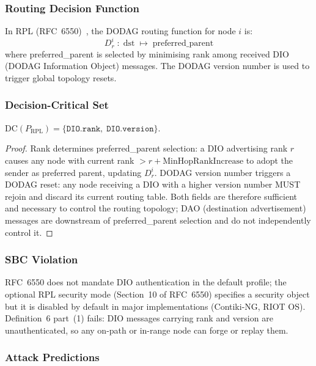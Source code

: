 \subsubsection*{Routing Decision Function}

In RPL (RFC~6550)~\cite{rfc6550}, the DODAG routing function for node $i$ is:
\[
  D_{r}^{i} \;:\; \mathrm{dst} \;\mapsto\; \mathrm{preferred\_parent}
\]
where preferred\_parent is selected by minimising rank among received DIO
(DODAG Information Object) messages.
The DODAG version number is used to trigger global topology resets.

\subsubsection*{Decision-Critical Set}

\begin{proposition}
$\mathrm{DC}(P_{\mathrm{RPL}}) = \{\texttt{DIO.rank},\; \texttt{DIO.version}\}$.
\end{proposition}

\begin{proof}
Rank determines preferred\_parent selection: a DIO advertising rank $r$
causes any node with current rank $> r + \mathrm{MinHopRankIncrease}$ to
adopt the sender as preferred parent, updating $D_{r}^{i}$.
DODAG version number triggers a DODAG reset: any node receiving a DIO with
a higher version number MUST rejoin and discard its current routing table.
Both fields are therefore sufficient and necessary to control the routing
topology; DAO (destination advertisement) messages are downstream of
preferred\_parent selection and do not independently control it.
\end{proof}

\subsubsection*{SBC Violation}

RFC~6550 does not mandate DIO authentication in the default profile; the
optional RPL security mode (Section~10 of RFC~6550) specifies a security
object but it is disabled by default in major implementations
(Contiki-NG, RIOT OS).
Definition~6 part~(1) fails: DIO messages carrying rank and version are
unauthenticated, so any on-path or in-range node can forge or replay them.

\subsubsection*{Attack Predictions}

